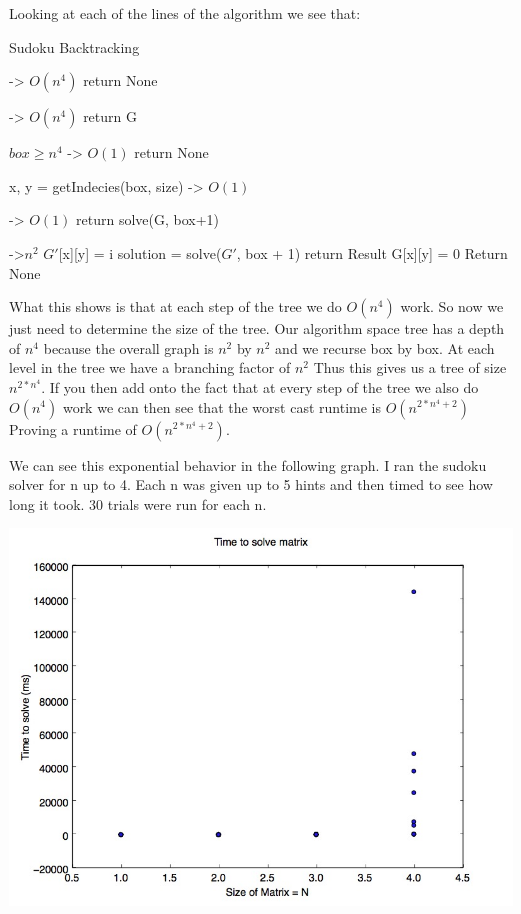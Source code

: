\documentclass{sig-alternate}
\begin{document}
Looking at each of the lines of the algorithm we see that:

\begin{algorithm}
\caption{Sudoku Backtracking}\label{solve}
\begin{algorithmic}[1]

 -> $O(n^4)$
\State return None
\EndIf

 -> $O(n^4)$
\State return G
\EndIf

\If $box \ge n^4$ -> $O(1)$
\State return None
\EndIf

\State x, y = getIndecies(box, size) -> $O(1)$

 -> $O(1)$
\State return solve(G, box+1)
\EndIf

 ->$n^2$
\State $G'$[x][y] = i
\State solution = solve($G'$, box + 1) 
\State return Result
\EndIf
\EndFor
\State G[x][y] = 0
\State Return None
\EndProcedure
\end{algorithmic}
\end{algorithm}

What this shows is that at each step of the tree we do $O(n^4)$ work. So now we just need to determine the size of the tree. Our algorithm space tree has a depth of $n^4$ because the overall graph is $n^2$ by $n^2$ and we recurse box by box. At each level in the tree we have a branching factor of $n^2$ Thus this gives us a tree of size $n^{2*n^4}$. If you then add onto the fact that at every step of the tree we also do $O(n^4)$ work we can then see that the worst cast runtime is $O(n^{2*n^4 + 2})$ Proving a runtime of $O(n^{2*n^4 + 2})$. 

We can see this exponential behavior in the following graph. I ran the sudoku solver for n up to 4. Each n was given up to 5 hints and then timed to see how long it took. 30 trials were run for each n. 

\includegraphics[width=\linewidth]{src/allN.jpg}
\end{document}
